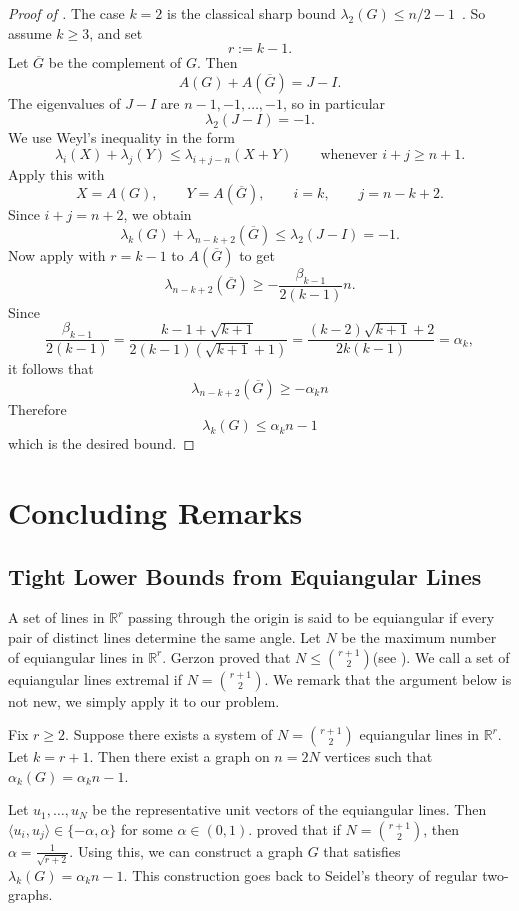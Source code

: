 \documentclass[12pt]{amsart}
\theoremstyle{myremark}
\newcommand{\R}{\mathbb{R}}
\newcommand{\1}{\mathbf{1}}
\newcommand{\inner}[2]{\langle #1,#2\rangle}
\begin{document}
\begin{proof}[Proof of ]
The case $k=2$ is the classical sharp bound $\lambda_2(G)\le n/2-1$~\cite{Hong88,Nikiforov15}. So assume $k\ge 3$, and set
\[
r:=k-1.
\]
Let $\overline G$ be the complement of $G$. Then
\[
A(G)+A(\overline G)=J-I.
\]
The eigenvalues of $J-I$ are $n-1,-1,\dots,-1$, so in particular
\[
\lambda_2(J-I)=-1.
\]
We use Weyl's inequality in the form
\[
\lambda_i(X)+\lambda_j(Y)\le \lambda_{i+j-n}(X+Y)
\qquad\text{whenever } i+j\ge n+1.
\]
Apply this with
\[
X=A(G),
\qquad
Y=A(\overline G),
\qquad
i=k,
\qquad
j=n-k+2.
\]
Since $i+j=n+2$, we obtain
\[
\lambda_k(G)+\lambda_{n-k+2}(\overline G)\le \lambda_2(J-I)=-1.
\]
Now apply  with $r=k-1$ to $A(\overline G)$ to get
\[
\lambda_{n-k+2}(\overline G)\ge -\frac{\beta_{k-1}}{2(k-1)}n.
\]
Since
\[
\frac{\beta_{k-1}}{2(k-1)}
=\frac{k-1+\sqrt{k+1}}{2(k-1)(\sqrt{k+1}+1)}
= \frac{(k-2)\sqrt{k+1}+2}{2k(k-1)}
=\alpha_k,
\]
it follows that
\[
\lambda_{n-k+2}(\overline G)\ge -\alpha_k n
\]
Therefore
\[
\lambda_k(G)\le \alpha_k n - 1
\]
which is the desired bound.
\end{proof}






\section{Concluding Remarks}\label{sec5}
\subsection{Tight Lower Bounds from Equiangular Lines}\label{disc:lowerbounds}
A set of lines in $\R^r$ passing through the origin is said to be equiangular if every pair of distinct lines determine the same angle. Let $N$ be the maximum number of equiangular lines in $\R^r$. Gerzon proved that $N \leq \binom{r+1}{2}$(see \cite{lemmens1973equiangular}). We call a set of equiangular lines extremal if $N = \binom{r+1}{2}$. We remark that the argument below is not new, we simply apply it to our problem. 

Fix $r \geq 2$. Suppose there exists a system of $N = \binom{r+1}{2}$ equiangular lines in $\R^r$. Let $k=r+1$. Then there exist a graph on $n = 2N$ vertices such that $\alpha_k(G) = \alpha_k n - 1$. 

Let $u_1,\ldots,u_N$ be the representative unit vectors of the equiangular lines. Then $\inner{u_i}{u_j} \in \{-\alpha,\alpha\}$ for some $\alpha \in (0,1)$. \cite{lemmens1973equiangular} proved that if $N = \binom{r+1}{2}$, then $\alpha = \frac{1}{\sqrt{r+2}}$. Using this, we can construct a graph $G$ that satisfies $\lambda_k(G) = \alpha_k n - 1$. This construction goes back to Seidel’s theory of regular two-graphs\cite{Seidel1976SurveyTwoGraphs}.
\end{document}
